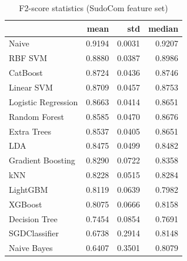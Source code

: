 \begin{table}
\caption{F2-score statistics (SudoCom feature set)}
\label{tab:f2_SudoCom_stats}
\begin{tabular}{lrrr}
\toprule
 & mean & std & median \\
\midrule
Naive & 0.9194 & 0.0031 & 0.9207 \\
RBF SVM & 0.8880 & 0.0387 & 0.8986 \\
CatBoost & 0.8724 & 0.0436 & 0.8746 \\
Linear SVM & 0.8709 & 0.0457 & 0.8753 \\
Logistic Regression & 0.8663 & 0.0414 & 0.8651 \\
Random Forest & 0.8585 & 0.0470 & 0.8676 \\
Extra Trees & 0.8537 & 0.0405 & 0.8651 \\
LDA & 0.8475 & 0.0499 & 0.8482 \\
Gradient Boosting & 0.8290 & 0.0722 & 0.8358 \\
kNN & 0.8228 & 0.0515 & 0.8284 \\
LightGBM & 0.8119 & 0.0639 & 0.7982 \\
XGBoost & 0.8075 & 0.0666 & 0.8158 \\
Decision Tree & 0.7454 & 0.0854 & 0.7691 \\
SGDClassifier & 0.6738 & 0.2914 & 0.8148 \\
Naive Bayes & 0.6407 & 0.3501 & 0.8079 \\
\bottomrule
\end{tabular}
\end{table}
